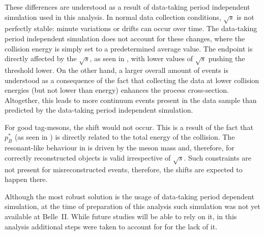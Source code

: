These differences are understood as a result of data-taking period independent simulation used in this analysis.
In normal data collection conditions, $\sqrt{s}$ is not perfectly stable: minute variations or drifts can occur over time.
The data-taking period independent simulation does not account for these changes, where the collision energy is simply set to a predetermined average value.
The \Mbc endpoint is directly affected by the $\sqrt{s}$, as seen in , with lower values of $\sqrt{s}$ pushing the \Mbc threshold lower.
On the other hand, a larger overall amount of \qqbar events is understood as a consequence of the fact that collecting the data at lower collision energies (but not lower than \FourS energy) enhances the \mbox{\epem\ra\qqbar} process cross-section.
Altogether, this leads to more continuum events present in the data sample than predicted by the data-taking period independent simulation.

For good tag-\B mesons, the shift would not occur.
This is a result of the fact that $p_B^*$ (as seen in ) is directly related to the total energy of the collision.
The resonant-like behaviour in \Mbc is driven by the \B meson mass and, therefore, for correctly reconstructed objects is valid irrespective of $\sqrt{s}$. 
Such constraints are not present for misreconstructed events, therefore, the shifts are expected to happen there.

Although the most robust solution is the usage of data-taking period dependent simulation, at the time of preparation of this analysis such simulation was not yet available at Belle~II.
While future studies will be able to rely on it, in this analysis additional steps were taken to account for for the lack of it.


